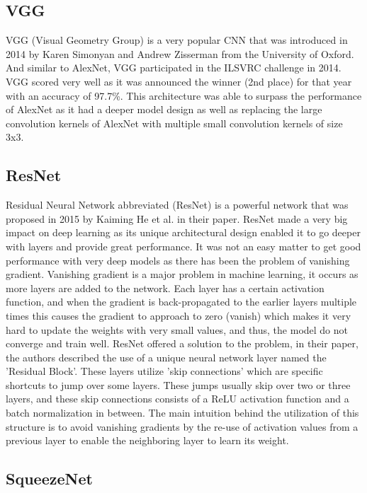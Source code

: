 \documentclass[conference]{IEEEtran}
\begin{document}
\subsection{VGG}
VGG (Visual Geometry Group) is a very popular CNN that was introduced in 2014 by Karen Simonyan and Andrew Zisserman from the University of Oxford. And similar to AlexNet, VGG participated in the ILSVRC challenge in 2014. VGG scored very well as it was announced the winner (2nd place) for that year with an accuracy of 97.7\%. This architecture was able to surpass the performance of AlexNet as it had a deeper model design as well as replacing the large convolution kernels of AlexNet with multiple small convolution kernels of size 3x3.





\subsection{ResNet}
Residual Neural Network abbreviated (ResNet) is a powerful network that was proposed in 2015 by Kaiming He et al. in their paper\cite{he2016deep}. ResNet made a very big impact on deep learning as its unique architectural design enabled it to go deeper with layers and provide great performance. It was not an easy matter to get good performance with very deep models as there has been the problem of vanishing gradient. Vanishing gradient is a major problem in machine learning, it occurs as more layers are added to the network. Each layer has a certain activation function, and when the gradient is back-propagated to the earlier layers multiple times this causes the gradient to approach to zero (vanish) which makes it very hard to update the weights with very small values, and thus, the model do not converge and train well. ResNet offered a solution to the problem, in their paper, the authors described the use of a unique neural network layer named the 'Residual Block'. These layers utilize 'skip connections' which are specific shortcuts to jump over some layers. These jumps usually skip over two or three layers, and these skip connections consists of a ReLU activation function and a batch normalization in between. The main intuition behind the utilization of this structure is to avoid vanishing gradients by the re-use of activation values from a previous layer to enable the neighboring layer to learn its weight.



\subsection{SqueezeNet}
\end{document}
